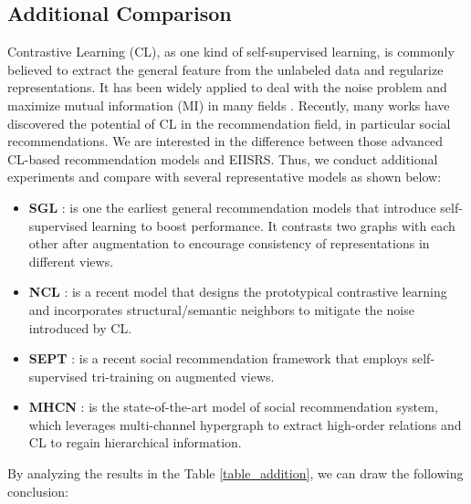 \documentclass[letterpaper]{article} %
\begin{document}
\subsection{Additional Comparison}
Contrastive Learning (CL), as one kind of self-supervised learning, is commonly believed to extract the general feature from the unlabeled data and regularize representations. It has been widely applied to deal with the noise problem and maximize mutual information (MI) in many fields \cite{deepInfoMax,S4L,selfCL}. Recently, many works have discovered the potential of CL in the recommendation field, in particular social recommendations. We are interested in the difference between those advanced CL-based recommendation models and EIISRS. Thus, we conduct additional experiments and compare with several representative models as shown below:
\begin{itemize}
    \item \textbf{SGL} \cite{sgl}: is one the earliest general recommendation models that introduce self-supervised learning to boost performance. It contrasts two graphs with each other after augmentation to encourage consistency of representations in different views.
    \item \textbf{NCL} \cite{ncl}: is a recent model that designs the prototypical contrastive learning and incorporates structural/semantic neighbors to mitigate the noise introduced by CL.
    \item \textbf{SEPT} \cite{SEPT}: is a recent social recommendation framework that employs self-supervised tri-training on augmented views. 
    \item \textbf{MHCN} \cite{MHCN}: is the state-of-the-art model of social recommendation system, which leverages multi-channel hypergraph to extract high-order relations and CL to regain hierarchical information.
\end{itemize}
By analyzing the results in the Table \ref{table_addition}, we can draw the following conclusion:
\end{document}
